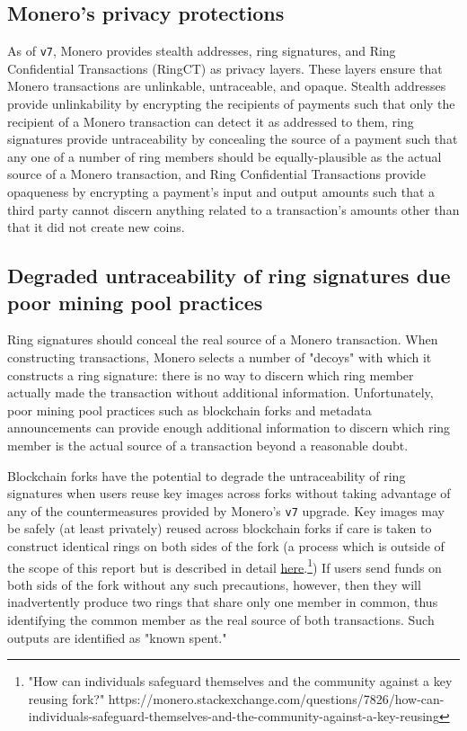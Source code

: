 \documentclass[notitlepage]{report}
\begin{document}
\subsection{Monero's privacy protections}

As of \verb/v7/, Monero provides stealth addresses, ring signatures, and Ring Confidential Transactions (RingCT) as privacy layers.  These layers ensure that Monero transactions are unlinkable, untraceable, and opaque.  Stealth addresses provide unlinkability by encrypting the recipients of payments such that only the recipient of a Monero transaction can detect it as addressed to them, ring signatures provide untraceability by concealing the source of a payment such that any one of a number of ring members should be equally-plausible as the actual source of a Monero transaction, and Ring Confidential Transactions provide opaqueness by encrypting a payment's input and output amounts such that a third party cannot discern anything related to a transaction's amounts other than that it did not create new coins.

\subsection{Degraded untraceability of ring signatures due poor mining pool practices} \label{cause}

Ring signatures should conceal the real source of a Monero transaction.  When constructing transactions, Monero selects a number of "decoys" with which it constructs a ring signature: there is no way to discern which ring member actually made the transaction without additional information.  Unfortunately, poor mining pool practices such as blockchain forks and metadata announcements can provide enough additional information to discern which ring member is the actual source of a transaction beyond a reasonable doubt.

Blockchain forks have the potential to degrade the untraceability of ring signatures when users reuse key images across forks without taking advantage of any of the countermeasures provided by Monero's \verb/v7/ upgrade.  Key images may be safely (at least privately) reused across blockchain forks if care is taken to construct identical rings on both sides of the fork (a process which is outside of the scope of this report but is described in detail \href{https://monero.stackexchange.com/questions/7826/how-can-individuals-safeguard-themselves-and-the-community-against-a-key-reusing}{here}.\footnote{"How can individuals safeguard themselves and the community against a key reusing fork?" https://monero.stackexchange.com/questions/7826/how-can-individuals-safeguard-themselves-and-the-community-against-a-key-reusing})  If users send funds on both sids of the fork without any such precautions, however, then they will inadvertently produce two rings that share only one member in common, thus identifying the common member as the real source of both transactions.  Such outputs are identified as "known spent."
\end{document}
